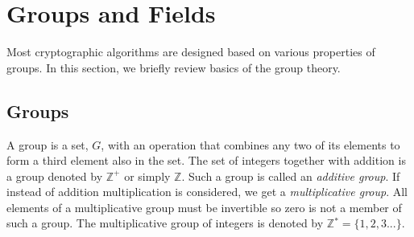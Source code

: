 \documentclass[10pt]{article}
\theoremstyle{plain}
\begin{document}
\section{Groups and Fields}

Most cryptographic algorithms are designed based on various properties
of groups. In this section, we briefly review basics of the group
theory.

\subsection{Groups}

A group is a set, $G$, with an operation that combines any two of
its elements to form a third element also in the set. The set of integers
together with addition is a group denoted by $\mathbb{Z}^{+}$ or
simply $\mathbb{Z}$. Such a group is called an \emph{additive group}.
If instead of addition multiplication is considered, we get a \emph{multiplicative
	group}. All elements of a multiplicative group must be invertible
so zero is not a member of such a group. The multiplicative group
of integers is denoted by $\mathbb{Z}{}^{*}=\{1,2,3...\}$.
\end{document}
